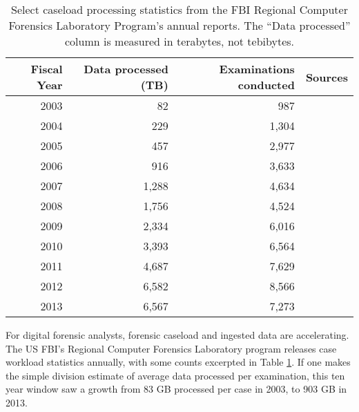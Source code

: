 \documentclass[11pt]{ucthesis}
\theoremstyle{plain}
\theoremstyle{definition}
\begin{document}
\begin{table}[htp]
\begin{small}
\caption{Select caseload processing statistics from the FBI Regional Computer Forensics Laboratory Program's annual reports.  The ``Data processed'' column is measured in terabytes, not tebibytes.}
\begin{center}
\begin{tabular}{rrrl}
\toprule
Fiscal Year & Data processed (TB) & Examinations conducted & Sources \\
\midrule
2003 &    82  &   987 & \cite{fbi:rcfl2003,fbi:rcfl2006,fbi:rcfl2007} \\
2004 &   229  & 1,304 & \cite{fbi:rcfl2004,fbi:rcfl2006,fbi:rcfl2007} \\
2005 &   457  & 2,977 & \cite{fbi:rcfl2005,fbi:rcfl2006,fbi:rcfl2007} \\
2006 &   916  & 3,633 & \cite{fbi:rcfl2006,fbi:rcfl2007} \\
2007 & 1,288  & 4,634 & \cite{fbi:rcfl2007} \\
2008 & 1,756  & 4,524 & \cite{fbi:rcfl2008} \\
2009 & 2,334  & 6,016 & \cite{fbi:rcfl2009} \\
2010 & 3,393  & 6,564 & \cite{fbi:rcfl2010} \\
2011 & 4,687  & 7,629 & \cite{fbi:rcfl2011,fbi:rcfl2012,fbi:rcfl2013} \\
2012 & 6,582  & 8,566 & \cite{fbi:rcfl2012,fbi:rcfl2013} \\
2013 & 6,567  & 7,273 & \cite{fbi:rcfl2013} \\
\bottomrule
\end{tabular}
\end{center}
\label{tbl:fbistats}
\end{small}
\end{table}%

For digital forensic analysts, forensic caseload and ingested data are accelerating.  The US FBI's Regional Computer Forensics Laboratory program releases case workload statistics annually, with some counts excerpted in Table \ref{tbl:fbistats}.  If one makes the simple division estimate of average data processed per examination, this ten year window saw a growth from 83 GB processed per case in 2003, to 903 GB in 2013.
\end{document}

